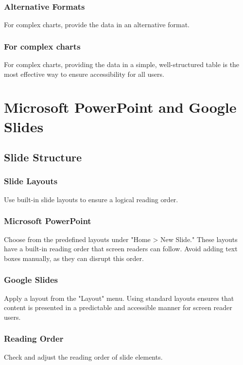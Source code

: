 \subsubsection{Alternative Formats}\label{ch15:sssec:alt-formats}
For complex charts, provide the data in an alternative format.

\subsubsection{For complex charts}\label{ch15:sssec:complex-charts-alt}
For complex charts, providing the data in a simple, well-structured table is the most effective way to ensure accessibility for all users.

\section{Microsoft PowerPoint and Google Slides}\label{ch15:sec:ppt-slides}

\subsection{Slide Structure}\label{ch15:ssec:slide-structure}

\subsubsection{Slide Layouts}\label{ch15:sssec:slide-layouts}
Use built-in slide layouts to ensure a logical reading order.

\subsubsection{Microsoft PowerPoint}\label{ch15:sssec:ppt-layouts}
Choose from the predefined layouts under "Home > New Slide." These layouts have a built-in reading order that screen readers can follow. Avoid adding text boxes manually, as they can disrupt this order.

\subsubsection{Google Slides}\label{ch15:sssec:slides-layouts}
Apply a layout from the "Layout" menu. Using standard layouts ensures that content is presented in a predictable and accessible manner for screen reader users.

\subsubsection{Reading Order}\label{ch15:sssec:reading-order}
Check and adjust the reading order of slide elements.

